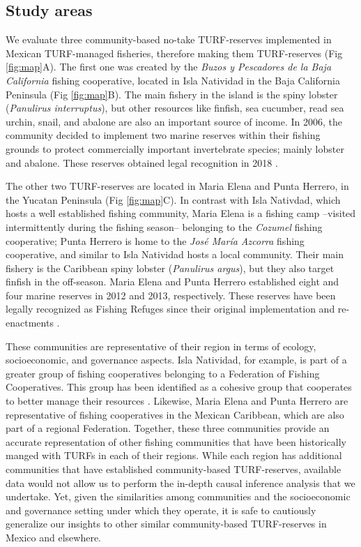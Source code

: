 \documentclass{frontiersSCNS}
\begin{document}
\hypertarget{study-areas}{%
\subsection{Study areas}\label{study-areas}}

We evaluate three community-based no-take TURF-reserves implemented in
Mexican TURF-managed fisheries, therefore making them TURF-reserves (Fig
\ref{fig:map}A). The first one was created by the \emph{Buzos y
Pescadores de la Baja California} fishing cooperative, located in Isla
Natividad in the Baja California Peninsula (Fig \ref{fig:map}B). The
main fishery in the island is the spiny lobster (\emph{Panulirus
interruptus}), but other resources like finfish, sea cucumber, read sea
urchin, snail, and abalone are also an important source of income. In
2006, the community decided to implement two marine reserves within
their fishing grounds to protect commercially important invertebrate
species; mainly lobster and abalone. These reserves obtained legal
recognition in 2018 \citep{dof_website_2018}.

The other two TURF-reserves are located in Maria Elena and Punta
Herrero, in the Yucatan Peninsula (Fig \ref{fig:map}C). In contrast with
Isla Nativdad, which hosts a well established fishing community, Maria
Elena is a fishing camp --visited intermittently during the fishing
season-- belonging to the \emph{Cozumel} fishing cooperative; Punta
Herrero is home to the \emph{José María Azcorra} fishing cooperative,
and similar to Isla Natividad hosts a local community. Their main
fishery is the Caribbean spiny lobster (\emph{Panulirus argus}), but
they also target finfish in the off-season. Maria Elena and Punta
Herrero established eight and four marine reserves in 2012 and 2013,
respectively. These reserves have been legally recognized as Fishing
Refuges since their original implementation
\citep{dof_website_2012,dof_website_2013} and re-enactments
\citep{dof_website_2017b}.

These communities are representative of their region in terms of
ecology, socioeconomic, and governance aspects. Isla Natividad, for
example, is part of a greater group of fishing cooperatives belonging to
a Federation of Fishing Cooperatives. This group has been identified as
a cohesive group that cooperates to better manage their resources
\citep{mccay_2014,mccay_2017,acevesbueno_2017}. Likewise, Maria Elena
and Punta Herrero are representative of fishing cooperatives in the
Mexican Caribbean, which are also part of a regional Federation.
Together, these three communities provide an accurate representation of
other fishing communities that have been historically manged with TURFs
in each of their regions. While each region has additional communities
that have established community-based TURF-reserves, available data
would not allow us to perform the in-depth causal inference analysis
that we undertake. Yet, given the similarities among communities and the
socioeconomic and governance setting under which they operate, it is
safe to cautiously generalize our insights to other similar
community-based TURF-reserves in Mexico and elsewhere.
\end{document}

